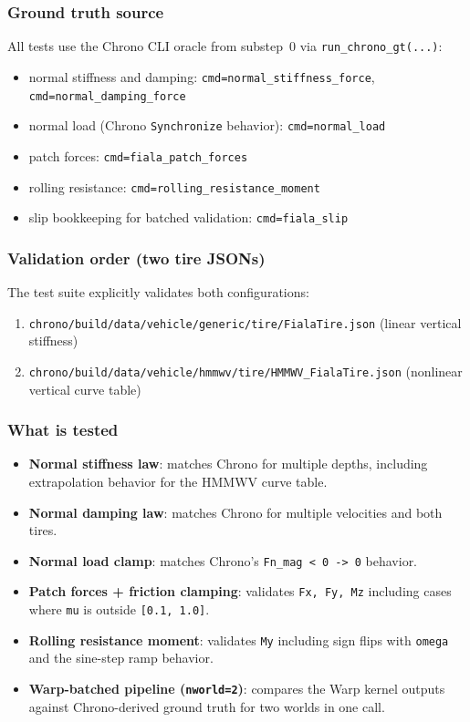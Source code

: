\subsubsection{Ground truth source}
All tests use the Chrono CLI oracle from substep~0 via \texttt{run\_chrono\_gt(...)}:
\begin{itemize}
  \item normal stiffness and damping: \texttt{cmd=normal\_stiffness\_force}, \texttt{cmd=normal\_damping\_force}
  \item normal load (Chrono \texttt{Synchronize} behavior): \texttt{cmd=normal\_load}
  \item patch forces: \texttt{cmd=fiala\_patch\_forces}
  \item rolling resistance: \texttt{cmd=rolling\_resistance\_moment}
  \item slip bookkeeping for batched validation: \texttt{cmd=fiala\_slip}
\end{itemize}

\subsubsection{Validation order (two tire JSONs)}
The test suite explicitly validates both configurations:
\begin{enumerate}
  \item \texttt{chrono/build/data/vehicle/generic/tire/FialaTire.json} (linear vertical stiffness)
  \item \texttt{chrono/build/data/vehicle/hmmwv/tire/HMMWV\_FialaTire.json} (nonlinear vertical curve table)
\end{enumerate}

\subsubsection{What is tested}
\begin{itemize}
  \item \textbf{Normal stiffness law}:
    matches Chrono for multiple depths, including extrapolation behavior for the HMMWV curve table.
  \item \textbf{Normal damping law}:
    matches Chrono for multiple velocities and both tires.
  \item \textbf{Normal load clamp}:
    matches Chrono's \texttt{Fn\_mag < 0 -> 0} behavior.
  \item \textbf{Patch forces + friction clamping}:
    validates \texttt{Fx, Fy, Mz} including cases where \texttt{mu} is outside \texttt{[0.1, 1.0]}.
  \item \textbf{Rolling resistance moment}:
    validates \texttt{My} including sign flips with \texttt{omega} and the sine-step ramp behavior.
  \item \textbf{Warp-batched pipeline (\texttt{nworld=2})}:
    compares the Warp kernel outputs against Chrono-derived ground truth for two worlds in one call.
\end{itemize}

